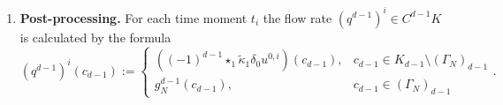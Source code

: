 \begin{algorithm}
\begin{enumerate}
\begin{itemize}
          the solution $\overline{x}^{i + 1}$ on the non-Dirichlet nodes
          (allocated only once, there is no need to store it on every step),
          \begin{equation}
            \overline{x}^{i + 1} := \overline{w_\tau}^i + \overline{z_\tau};
          \end{equation}
        \item
          the final solution
          \begin{equation}
            x^{i + 1}_j :=
            \begin{cases}
              \overline{x}^{i + 1}_j, & j \in J \\
              g_D^0(N_j), & j \in I
            \end{cases}.
          \end{equation}
      \end{itemize}
    \item
      \textbf{Post-processing.}
      For each time moment $t_i$ the flow rate $(q^{d - 1})^i \in C^{d - 1} K$
      is calculated by the formula
      \begin{equation}
        (q^{d - 1})^i(c_{d - 1}) :=
        \begin{cases}
          ((-1)^{d - 1} \star_1 \tilde{\kappa}_1 \delta_0 u^{0,i})(c_{d - 1}),
            & c_{d - 1} \in K_{d - 1} \setminus (\Gamma_N)_{d - 1} \\
          g_N^{d - 1}(c_{d - 1}), & c_{d - 1} \in (\Gamma_N)_{d - 1}
        \end{cases}.
      \end{equation}
  \end{enumerate}
\end{algorithm}
